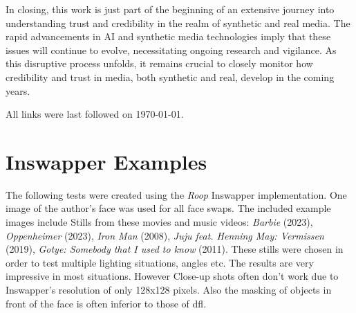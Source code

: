 \documentclass[
  a4paper,  %
  twoside,  %
  bibliography=totoc,
  headsepline,
  cleardoublepage=empty,
  parskip=half,
  draft=false
]{scrbook}
\begin{document}
In closing, this work is just part of the beginning of an extensive journey into understanding trust and credibility in the realm of synthetic and real media. The rapid advancements in AI and synthetic media technologies imply that these issues will continue to evolve, necessitating ongoing research and vigilance. As this disruptive process unfolds, it remains crucial to closely monitor how credibility and trust in media, both synthetic and real, develop in the coming years.


\printbibliography
All links were last followed on \today{}.

\appendix
\chapter{Inswapper Examples}
\label{chap:insightface-demos}
The following tests were created using the \textit{Roop} Inswapper implementation. One image of the author's face was used for all face swaps. The included example images include Stills from these movies and music videos: \textit{Barbie} (2023), \textit{Oppenheimer} (2023), \textit{Iron Man} (2008), \textit{Juju feat. Henning May: Vermissen} (2019), \textit{Gotye: Somebody that I used to know} (2011).
These stills were chosen in order to test multiple lighting situations, angles etc. The results are very impressive in most situations. However Close-up shots often don't work due to Inswapper's resolution of only 128x128 pixels. Also the masking of objects in front of the face is often inferior to those of \gls{dfl}.
\end{document}
